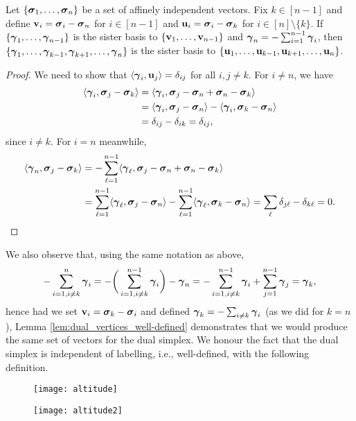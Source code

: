 \begin{lemma}
	\label{lem:dual_vertices_well-defined}
	Let $\{\vb*{\sigma}_1,\dots,\vb*{\sigma}_n\}$ be a set of affinely independent vectors. Fix $k\in [n-1]$ and define $\vb{v}_i=\vb*{\sigma}_i-\vb*{\sigma}_n$ for $i\in[n-1]$ and $\vb{u}_i=\vb*{\sigma}_i-\vb*{\sigma}_k$ for $i\in[n]\setminus\{k\}$. If $\{\vb*{\gamma}_1,\dots,\vb*{\gamma}_{n-1}\}$ is the sister basis to $\{\vb{v}_1,\dots,\vb{v}_{n-1}\}$ and $\vb*{\gamma}_n = -\sum_{i=1}^{n-1}\vb*{\gamma}_i$, then $\{\vb*{\gamma}_1,\dots,\vb*{\gamma}_{k-1},\vb*{\gamma}_{k+1},\dots,\vb*{\gamma}_{n}\}$ is the sister basis to $\{\vb{u}_1,\dots,\vb{u}_{k-1},\vb{u}_{k+1},\dots,\vb{u}_n\}$. 
\end{lemma}
\begin{proof}
	We need to show that $\langle \vb*{\gamma}_i,\vb{u}_j\rangle = \delta_{ij}$ for all $i,j\neq k$. For $i\neq n$, we have 
	\begin{align*}
	\langle \vb*{\gamma}_i, \vb*{\sigma}_j-\vb*{\sigma}_k\rangle &= \langle \vb*{\gamma}_i,\vb*{\sigma}_j-\vb*{\sigma}_n+\vb*{\sigma}_n-\vb*{\sigma}_k\rangle \\
	&= \langle \vb*{\gamma}_i,\vb*{\sigma}_j-\vb*{\sigma}_n \rangle - \langle \vb*{\gamma}_i,\vb*{\sigma}_k-\vb*{\sigma}_n\rangle \\
	&= \delta_{ij} - \delta_{ik} = \delta_{ij},
	\end{align*}
	since $i\neq k$. For $i=n$ meanwhile, 
	\begin{align*}
	\langle \vb*{\gamma}_n,\vb*{\sigma}_j-\vb*{\sigma}_k\rangle &= -\sum_{\ell=1}^{n-1}\langle \vb*{\gamma}_\ell,\vb*{\sigma}_j-\vb*{\sigma}_n+\vb*{\sigma}_n-\vb*{\sigma}_k\rangle \\
	&= \sum_{\ell=1}^{n-1}\langle \vb*{\gamma}_\ell,\vb*{\sigma}_j-\vb*{\sigma}_n\rangle - \sum_{\ell=1}^{n-1}\langle  \vb*{\gamma}_\ell,\vb*{\sigma}_k-\vb*{\sigma}_n\rangle =\sum_{\ell}\delta_{j\ell}-\delta_{k\ell}=0. \qedhere
	\end{align*}
\end{proof}

We also observe that, using the same notation as above, 
\[-\sum_{i=1,i\neq k}^n \vb*{\gamma}_i = -\bigg(\sum_{i=1,i\neq k}^{n-1} \vb*{\gamma}_i\bigg) - \vb*{\gamma}_n = -\sum_{i=1,i\neq k}^{n-1}\vb*{\gamma}_i + \sum_{j=1}^{n-1} \vb*{\gamma}_j = \vb*{\gamma}_k,\]
hence had we set $\vb{v}_i=\vb*{\sigma}_k-\vb*{\sigma}_i$ and defined $\vb*{\gamma}_k = -\sum_{i\neq k}\vb*{\gamma}_i$ (as we did for $k=n$), Lemma \ref{lem:dual_vertices_well-defined} demonstrates that we would produce the same set of vectors for the dual simplex. We honour the fact that the dual simplex is independent of labelling, i.e., well-defined, with the following definition. 

\begin{figure}
	\centering
	\begin{minipage}{0.45\textwidth}
		\centering
		\texttt{[image: altitude]}
	\end{minipage}
	\begin{minipage}{0.45\textwidth}
		\centering
		\texttt{[image: altitude2]}
	\end{minipage}
\end{figure}



